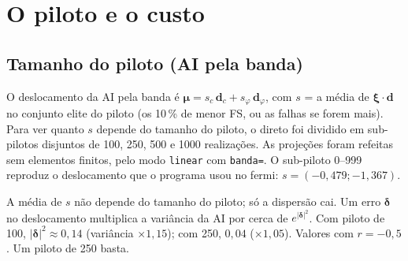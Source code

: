 \documentclass[11pt,a4paper]{article}
\begin{document}
\section{O piloto e o custo}\label{sec:custo}
\subsection{Tamanho do piloto (AI pela banda)}
O deslocamento da AI pela banda é $\bm\mu = s_c\,\bm d_c + s_\varphi\,\bm d_\varphi$, com $s$ = a média de $\bm\xi\cdot\bm d$ no
conjunto elite do piloto (os 10\,\% de menor FS, ou as falhas se forem mais). Para ver quanto $s$ depende do tamanho do
piloto, o direto foi dividido em sub-pilotos disjuntos de 100, 250, 500 e 1000 realizações. As projeções foram refeitas
sem elementos finitos, pelo modo \texttt{linear} com \texttt{banda=}. O sub-piloto 0--999 reproduz o deslocamento que o
programa usou no fermi: $s = (-0{,}479; -1{,}367)$.
\begin{table}[H]\centering\small
{}
\caption{O deslocamento da banda com pilotos de tamanhos diferentes.}
\end{table}
A média de $s$ não depende do tamanho do piloto; só a dispersão cai. Um erro $\bm\delta$ no deslocamento multiplica a
variância da AI por cerca de $e^{|\bm\delta|^2}$. Com piloto de 100, $|\bm\delta|^2 \approx 0{,}14$ (variância $\times1{,}15$); com 250, $0{,}04$ ($\times1{,}05$). Valores com $r = -0{,}5$. Um piloto de 250 basta.
\end{document}

